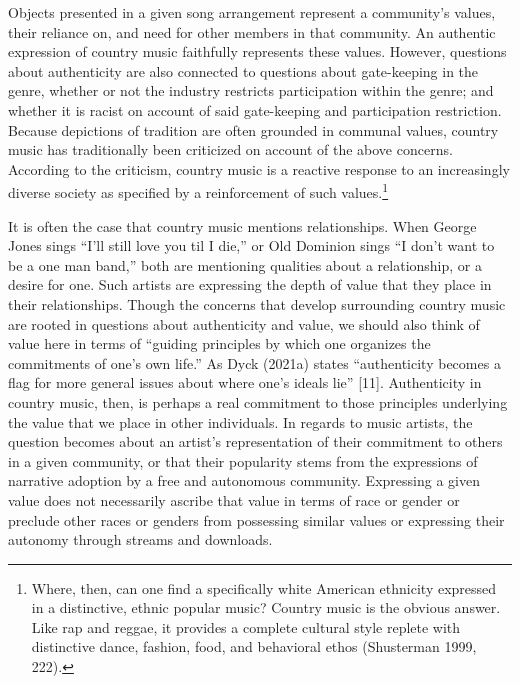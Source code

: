 \documentclass[
  letterpaper,
  DIV=11,
  numbers=noendperiod]{scrartcl}
\theoremstyle{remark}
\begin{document}
Objects presented in a given song arrangement represent a community's
values, their reliance on, and need for other members in that community.
An authentic expression of country music faithfully represents these
values. However, questions about authenticity are also connected to
questions about gate-keeping in the genre, whether or not the industry
restricts participation within the genre; and whether it is racist on
account of said gate-keeping and participation restriction. Because
depictions of tradition are often grounded in communal values, country
music has traditionally been criticized on account of the above
concerns. According to the criticism, country music is a reactive
response to an increasingly diverse society as specified by a
reinforcement of such values.\footnote{Where, then, can one find a
  specifically white American ethnicity expressed in a distinctive,
  ethnic popular music? Country music is the obvious answer. Like rap
  and reggae, it provides a complete cultural style replete with
  distinctive dance, fashion, food, and behavioral ethos (Shusterman
  1999, 222).}

It is often the case that country music mentions relationships. When
George Jones sings ``I'll still love you til I die,'' or Old Dominion
sings ``I don't want to be a one man band,'' both are mentioning
qualities about a relationship, or a desire for one. Such artists are
expressing the depth of value that they place in their relationships.
Though the concerns that develop surrounding country music are rooted in
questions about authenticity and value, we should also think of value
here in terms of ``guiding principles by which one organizes the
commitments of one's own life.'' As Dyck (2021a) states ``authenticity
becomes a flag for more general issues about where one's ideals lie''
{[}11{]}. Authenticity in country music, then, is perhaps a real
commitment to those principles underlying the value that we place in
other individuals. In regards to music artists, the question becomes
about an artist's representation of their commitment to others in a
given community, or that their popularity stems from the expressions of
narrative adoption by a free and autonomous community. Expressing a
given value does not necessarily ascribe that value in terms of race or
gender or preclude other races or genders from possessing similar values
or expressing their autonomy through streams and downloads.
\end{document}
